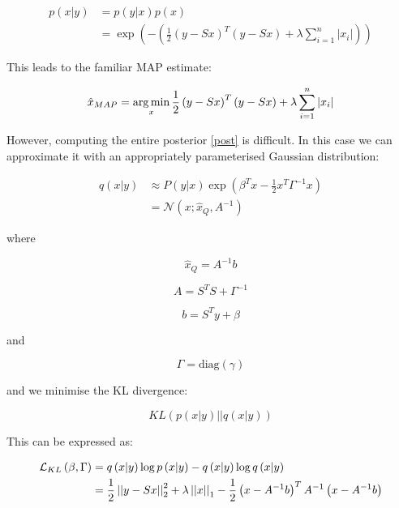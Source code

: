 \documentclass{article}
\begin{document}
\begin{align}
p\left(x|y\right) &= p\left(y|x\right)p\left(x\right) \nonumber \\
& = \exp\left( - \left(\frac{1}{2}\left(y-Sx\right)^T\left(y-Sx\right) + \lambda	\sum	_{i=1}^n |x_i| \right)  \right) 
\label{post}
\end{align}

This leads to the familiar MAP estimate:

\begin{equation}
\hat{x}_{MAP} = \operatorname*{arg\,min}_x \frac{1}{2}\left(y-Sx\right)^T\left(y-Sx\right) + \lambda	\sum	_{i=1}^n |x_i|
\end{equation}

However, computing the entire posterior \ref{post} is difficult. In this case we can approximate it with an appropriately parameterised Gaussian distribution:

\begin{align}
q\left(x|y\right) &\approx P(y|x)\exp\left( \beta^Tx - \frac{1}{2}x^T\Gamma^{-1}x \right) \\
&= \mathcal{N}\left(x; \hat{x}_Q, A^{-1}\right)
\end{align}

where

\begin{equation}
\hat{x}_Q = A^{-1} b
\end{equation}

\begin{equation}
A = S^TS + \Gamma^{-1}
\end{equation}

\begin{equation}
b = S^T y + \beta
\end{equation}

and

\begin{equation}
\Gamma = \text{diag}\left(\gamma\right)
\end{equation}

and we minimise the KL divergence:

\begin{equation}
KL\left( p\left(x|y\right) || q\left(x|y\right) \right)
\end{equation}

This can be expressed as:

\begin{align}
\mathcal{L}_{KL}\left(\beta, \Gamma\right) &= q\left(x|y\right)\log{p\left(x|y\right)} - q\left(x|y\right)\log{q\left(x|y\right)} \\
&= \frac{1}{2}\left|\left|y-Sx\right|\right|_2^2 + \lambda\left|\left|x\right|\right|_1 - \frac{1}{2}\left(x - A^{-1}b\right)^TA^{-1}\left(x - A^{-1}b\right)
\end{align}
\end{document}
